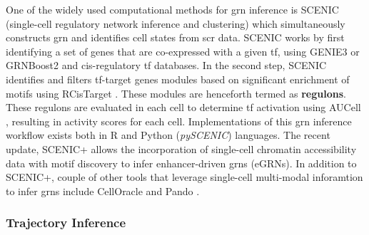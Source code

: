 \par One of the widely used computational methods for \gls{grn} inference is SCENIC (single-cell regulatory network inference and clustering) \textbf{\cite{aibar_scenic_2017,van_de_sande_scalable_2020}} which simultaneously constructs \gls{grn} and identifies cell states from \gls{scr} data. SCENIC works by first identifying a set of genes that are co-expressed with a given \gls{tf}, using GENIE3 \textbf{\cite{huynh-thu_inferring_2010}} or GRNBoost2 \textbf{\cite{moerman_grnboost2_2019}} and cis-regulatory \gls{tf} databases. In the second step, SCENIC identifies and filters \gls{tf}-target genes modules based on significant enrichment of motifs using  RCisTarget \textbf{\cite{aibar_scenic_2017,noauthor_rcistarget_nodate}}. These modules are henceforth termed as \textbf{regulons}. These regulons are evaluated in each cell to determine \gls{tf} activation using AUCell \textbf{\cite{aibar_scenic_2017,noauthor_aucell_nodate}}, resulting in activity scores for each cell. Implementations of this \gls{grn} inference workflow exists both in R and Python (\textit{pySCENIC}) \textbf{\cite{kumar_inference_2021}} languages. The recent update, SCENIC+ \textbf{\cite{bravo_gonzalez-blas_scenic_2023}} allows the incorporation of single-cell chromatin accessibility data with motif discovery to infer enhancer-driven \glspl{grn} (eGRNs). In addition to SCENIC+, couple of other tools that leverage single-cell multi-modal inforamtion to infer \glspl{grn} include CellOracle \textbf{\cite{kamimoto_dissecting_2023}} and Pando \textbf{\cite{fleck_inferring_2023}}. 



\subsubsection{Trajectory Inference}
\label{sec:scrna_analysis_grn}


